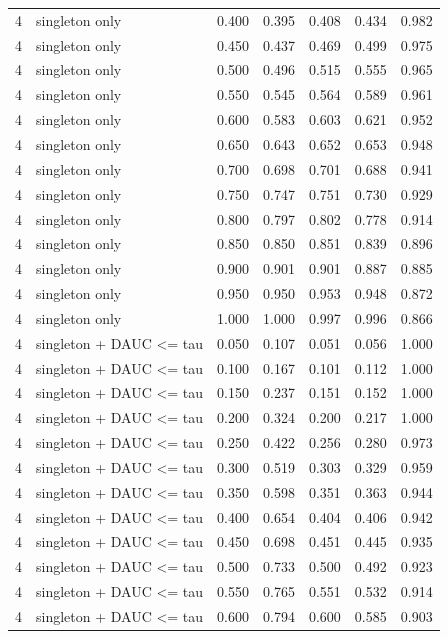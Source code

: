 \begin{tabular}{rlrrrrr}
4 & singleton only & 0.400 & 0.395 & 0.408 & 0.434 & 0.982 \\
4 & singleton only & 0.450 & 0.437 & 0.469 & 0.499 & 0.975 \\
4 & singleton only & 0.500 & 0.496 & 0.515 & 0.555 & 0.965 \\
4 & singleton only & 0.550 & 0.545 & 0.564 & 0.589 & 0.961 \\
4 & singleton only & 0.600 & 0.583 & 0.603 & 0.621 & 0.952 \\
4 & singleton only & 0.650 & 0.643 & 0.652 & 0.653 & 0.948 \\
4 & singleton only & 0.700 & 0.698 & 0.701 & 0.688 & 0.941 \\
4 & singleton only & 0.750 & 0.747 & 0.751 & 0.730 & 0.929 \\
4 & singleton only & 0.800 & 0.797 & 0.802 & 0.778 & 0.914 \\
4 & singleton only & 0.850 & 0.850 & 0.851 & 0.839 & 0.896 \\
4 & singleton only & 0.900 & 0.901 & 0.901 & 0.887 & 0.885 \\
4 & singleton only & 0.950 & 0.950 & 0.953 & 0.948 & 0.872 \\
4 & singleton only & 1.000 & 1.000 & 0.997 & 0.996 & 0.866 \\
4 & singleton + DAUC <= tau & 0.050 & 0.107 & 0.051 & 0.056 & 1.000 \\
4 & singleton + DAUC <= tau & 0.100 & 0.167 & 0.101 & 0.112 & 1.000 \\
4 & singleton + DAUC <= tau & 0.150 & 0.237 & 0.151 & 0.152 & 1.000 \\
4 & singleton + DAUC <= tau & 0.200 & 0.324 & 0.200 & 0.217 & 1.000 \\
4 & singleton + DAUC <= tau & 0.250 & 0.422 & 0.256 & 0.280 & 0.973 \\
4 & singleton + DAUC <= tau & 0.300 & 0.519 & 0.303 & 0.329 & 0.959 \\
4 & singleton + DAUC <= tau & 0.350 & 0.598 & 0.351 & 0.363 & 0.944 \\
4 & singleton + DAUC <= tau & 0.400 & 0.654 & 0.404 & 0.406 & 0.942 \\
4 & singleton + DAUC <= tau & 0.450 & 0.698 & 0.451 & 0.445 & 0.935 \\
4 & singleton + DAUC <= tau & 0.500 & 0.733 & 0.500 & 0.492 & 0.923 \\
4 & singleton + DAUC <= tau & 0.550 & 0.765 & 0.551 & 0.532 & 0.914 \\
4 & singleton + DAUC <= tau & 0.600 & 0.794 & 0.600 & 0.585 & 0.903 \\

\end{tabular}
